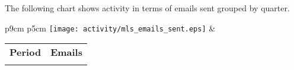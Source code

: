 

The following chart shows activity in terms of emails sent grouped by quarter.

\begin{tabular}{p{9cm} p{5cm}}
    \vspace{0pt} 
    \hspace*{-6cm}  
    \texttt{[image: activity/mls\_emails\_sent.eps]}
    & 
    \vspace{0pt}
    \begin{tabular}{l|l}%
    \bfseries Period & \bfseries Emails %
    \csvreader[head to column names]{activity/mls_emails_sent.csv}{}%
    {\\\Date & \emailssent}
    \end{tabular}
\end{tabular}





